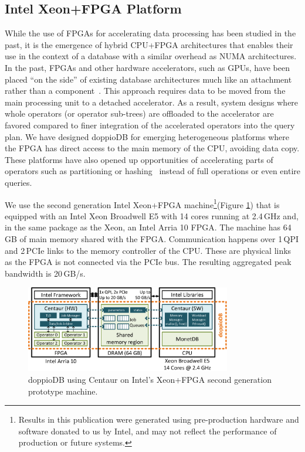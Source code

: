 \documentclass[11pt,dvipdfm]{article}
\newcommand{\dbname}{doppioDB}
\begin{document}



\subsection{Intel Xeon+FPGA Platform}
\label{sec:harp2}

While the use of FPGAs for accelerating data processing has been studied in the past, it is the emergence of hybrid CPU+FPGA architectures that enables their use in the context of a database with a similar overhead as NUMA architectures. In the past, FPGAs and other hardware accelerators, such as GPUs, have been placed ``on the side'' of existing database architectures much like an attachment rather than a component~\cite{ross2015gpu,netezza,jun2015bluedbm}. This approach requires data to be moved from the main processing unit to a detached accelerator. As a result, system designs where whole operators (or operator sub-trees) are offloaded to the accelerator are favored compared to finer integration of the accelerated operators into the query plan. We have designed doppioDB for emerging heterogeneous platforms where the FPGA has direct access to the main memory of the CPU, avoiding data copy. These platforms have also opened up opportunities of accelerating parts of operators such as partitioning or hashing~\cite{kara2017fpga} instead of full operations or even entire queries.

We use the second generation Intel Xeon+FPGA machine\footnote{Results in this publication were generated using pre-production hardware and software donated to us by Intel, and may not reflect the performance of production or future systems.}(Figure \ref{fig:harp-centaur}) that is equipped with an Intel Xeon Broadwell E5 with 14 cores running at 2.4\,GHz and, in the same package as the Xeon, an Intel Arria 10 FPGA. 
The machine has 64\,GB of main memory shared with the FPGA. Communication happens over 1\,QPI and 2\,PCIe links to the memory controller of the CPU. These are physical links as the FPGA is not connected via the PCIe bus. The resulting aggregated peak bandwidth is 20\,GB/s.

\begin{figure}[t]
    \begin{center}
        \includegraphics[width=0.8\textwidth]{figs/doppioDB.eps}
    \end{center}
	\caption{\dbname{} using Centaur on Intel's Xeon+FPGA second generation prototype machine.}
	\label{fig:harp-centaur}
\end{figure}
\end{document}
